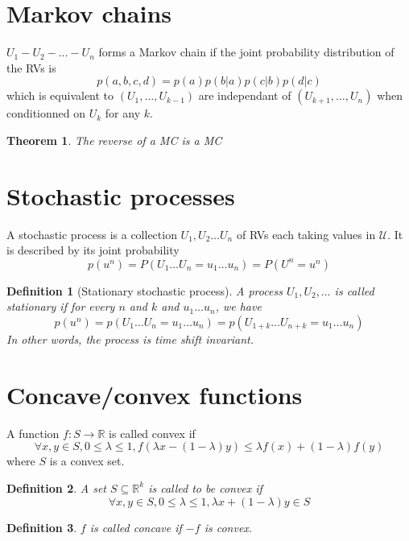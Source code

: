 \documentclass[twoside]{article}
\newtheorem{theorem}{Theorem}[section]
\newtheorem{definition}{Definition}[section]
\theoremstyle{definition} %
\def\U{\mathcal{U}}
\def\R{\mathbb{R}}
\begin{document}
\cleardoublepage
\begin{appendices}
\section{Markov chains}
\label{appendix:markov-chains}

$U_1 - U_2 - \dots - U_n$ forms a Markov chain if the joint probability
distribution of the RVs is
\[
  p(a,b,c,d) = p(a)p(b|a)p(c|b)p(d|c)
\]
which is equivalent to $(U_1, \dots, U_{k-1})$ are independant of $(U_{k+1}, \dots, U_n)$ when conditionned on $U_k$ for any $k$.


\begin{theorem}
  The reverse of a MC is a MC
\end{theorem}


\section{Stochastic processes}
\label{appendix:stoch-proc}

A stochastic process is a collection $U_1, U_2 \dots U_n$ of RVs each taking values in $\U$. It is described by its joint probability
\[
  p(u^n) = P(U_1 \dots U_n = u_1 \dots u_n) = P(U^n = u^n)
\]

\begin{definition}[Stationary stochastic process]
  A process $U_1, U_2, \dots$ is called stationary if for every $n$ and $k$ and $u_1 \dots u_n$, we have
  \[
    p(u^n) = p(U_1 \dots U_n = u_1 \dots u_n) = p(U_{1+k} \dots U_{n+k} = u_1 \dots u_n)
  \]
  In other words, the process is time shift invariant.
\end{definition}


\section{Concave/convex functions}
\label{sec:appendix-convex}

A function $f : S \rightarrow \R $ is called convex if
\[ \forall x,y \in S, 0 \leq \lambda \leq 1,  f(\lambda x - (1 - \lambda)y) \leq \lambda f(x) + (1 - \lambda) f(y) \]
where $S$ is a convex set.

\begin{definition}
  A set $S \subseteq \R^k$ is called to be convex if
  \[ \forall x,y \in S, 0 \leq \lambda \leq 1,  \lambda x + (1 - \lambda) y \in S\]
\end{definition}

\begin{definition}
  $f$ is called concave if $-f$ is convex.
\end{definition}


\end{appendices}
\end{document}

